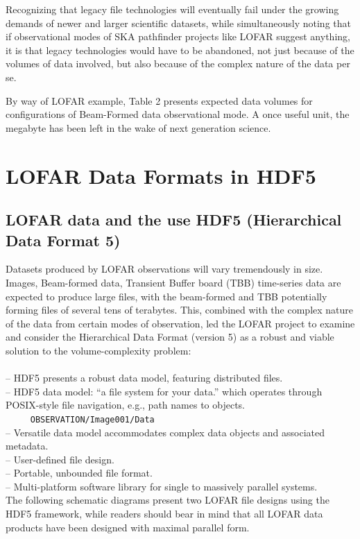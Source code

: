 \documentclass{PoS}
\begin{document}
Recognizing that legacy file technologies will eventually fail under the growing
demands of newer and larger scientific datasets, while simultaneously noting that if observational modes of SKA pathfinder projects like LOFAR suggest anything, it is that legacy technologies would have to be abandoned, not just because of the volumes of data involved, but also because of the complex nature of the data per se.

By way of LOFAR example, Table 2 presents expected data
volumes for configurations of Beam-Formed data observational mode.  A
once useful unit, the megabyte has been left in the wake of next
generation science. 

\section{LOFAR Data Formats in HDF5}
\subsection{LOFAR data and the use HDF5 (Hierarchical Data Format 5)}

Datasets produced by LOFAR observations will vary tremendously in
size.  Images, Beam-formed data, Transient Buffer board (TBB)
time-series data are expected to produce large files, with the
beam-formed and TBB potentially forming files of several tens of terabytes.  This, combined with the complex nature of the data from certain modes of observation, led the LOFAR project to examine and consider the Hierarchical Data Format (version 5) as a robust and viable solution to the volume-complexity problem:\\\\-- HDF5 presents a robust data model, featuring distributed files.\\
-- HDF5 data model: ``a file system for your data.'' which operates through POSIX-style file navigation, e.g.,  path names to objects.\\
\verb|     OBSERVATION/Image001/Data|\\
-- Versatile data model accommodates complex data objects and associated metadata.\\
-- User-defined file design.\\
-- Portable, unbounded file format.\\
 -- Multi-platform software library for single to massively parallel systems.\\

The following schematic diagrams present two  LOFAR file designs using the HDF5 framework, while readers should bear in mind that all LOFAR data products have been designed with maximal parallel form.
\end{document}
